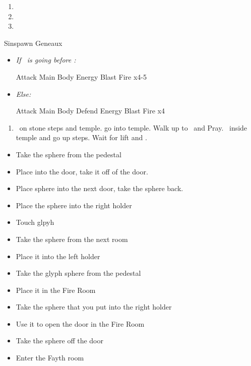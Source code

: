 \begin{enumerate}[resume]
	\item \sd
	\item \formation{\tidus}{\yuna}{\wakka}
	\item \save
\end{enumerate}
\vfill
\begin{battle}[3000]{Sinspawn Geneaux}
	\begin{itemize}
		\item \textit{If \tidus\ is going before \yuna:}
		      \begin{itemize}
			      \tidusf Attack Main Body
			      \summon{\valefor}
			      \valeforf Energy Blast \od
			      \valeforf Fire x4-5
		      \end{itemize}
		\item \textit{Else:}
		      \begin{itemize}
			      \switch{\yuna}{\kimahri}
			      \kimahrif Attack Main Body
			      \tidusf Defend
			      \switch{anyone}{\yuna}
			      \summon{\valefor}
			      \valeforf Energy Blast \od
			      \valeforf Fire x4
		      \end{itemize}
	\end{itemize}
\end{battle}
\begin{enumerate}[resume]
	\item \sd\ on stone steps and temple. go into temple. Walk up to \wakka\ and Pray. \sd\ inside temple and go up steps. Wait for lift and \sd.
\end{enumerate}
\begin{trial}
	\begin{itemize}
		\item Take the sphere from the pedestal
		\item Place into the door, take it off of the door.
		\item Place sphere into the next door, take the sphere back.
		\item Place the sphere into the right holder
		\item Touch glpyh
		\item Take the sphere from the next room
		\item Place it into the left holder
		\item Take the glyph sphere from the pedestal
		\item Place it in the Fire Room
		\item Take the sphere that you put into the right holder
		\item Use it to open the door in the Fire Room
		\item Take the sphere off the door
		\item Enter the Fayth room
	\end{itemize}
\end{trial}
